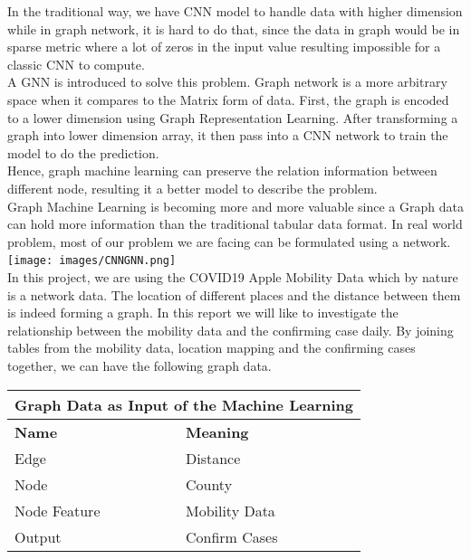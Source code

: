 In the traditional way, we have CNN model to handle data with higher dimension while in graph network, it is hard to do that, since the data in graph would be in sparse metric where a lot of zeros in the input value resulting impossible for a classic CNN to compute.\\

A GNN is introduced to solve this problem. Graph network is a more arbitrary space when it compares to the Matrix form of data. First, the graph is encoded to a lower dimension using Graph Representation Learning. After transforming a graph into lower dimension array, it then pass into a CNN network to train the model to do the prediction.\\

Hence, graph machine learning can preserve the relation information between different node, resulting it a better model to describe the problem.\\

Graph Machine Learning is becoming more and more valuable since a Graph data can hold more information than the traditional tabular data format. In real world problem, most of our problem we are facing can be formulated using a network. \\

\texttt{[image: images/CNNGNN.png]}
 ~\cite{CNNGNN}\\

In this project, we are using the COVID19 Apple Mobility Data which by nature is a network data. The location of different places and the distance between them is indeed forming a graph. In this report we will like to investigate the relationship between the mobility data and the confirming case daily. By joining tables from the mobility data, location mapping and the confirming cases together, we can have the following graph data.\\

\begin{tabular}{ |p{2cm}|p{2cm}| }
 \hline
 \multicolumn{2}{|c|}{Graph Data as Input of the Machine Learning} \\
 \hline
 \textbf{Name}    & \textbf{Meaning}  \\
 \hline
 Edge & Distance  \\
 \hline
 Node & County  \\
 \hline
 Node Feature & Mobility Data \\
 \hline
  Output & Confirm Cases \\
 \hline
\end{tabular}\\

